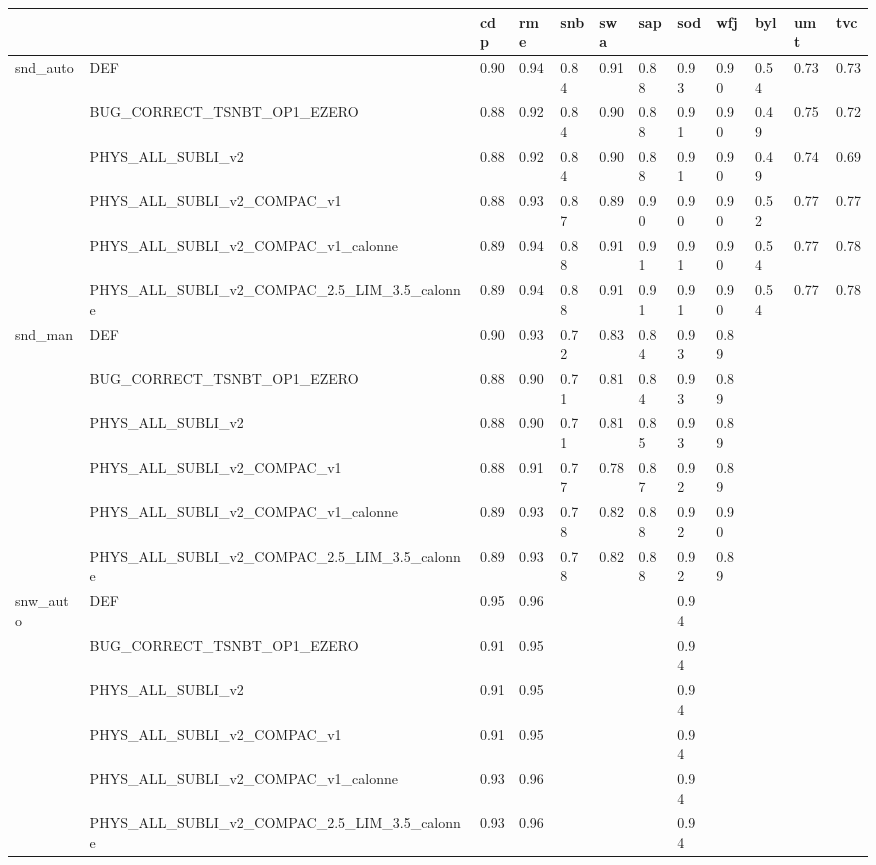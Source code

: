 \begin{tabular}{llllllllllll}
\toprule
 &  & cdp & rme & snb & swa & sap & sod & wfj & byl & umt & tvc \\
\midrule
\multirow[t]{6}{*}{snd_auto} & DEF & 0.90 & 0.94 & 0.84 & 0.91 & 0.88 & 0.93 & 0.90 & 0.54 & 0.73 & 0.73 \\
 & BUG_CORRECT_TSNBT_OP1_EZERO & 0.88 & 0.92 & 0.84 & 0.90 & 0.88 & 0.91 & 0.90 & 0.49 & 0.75 & 0.72 \\
 & PHYS_ALL_SUBLI_v2 & 0.88 & 0.92 & 0.84 & 0.90 & 0.88 & 0.91 & 0.90 & 0.49 & 0.74 & 0.69 \\
 & PHYS_ALL_SUBLI_v2_COMPAC_v1 & 0.88 & 0.93 & 0.87 & 0.89 & 0.90 & 0.90 & 0.90 & 0.52 & 0.77 & 0.77 \\
 & PHYS_ALL_SUBLI_v2_COMPAC_v1_calonne & 0.89 & 0.94 & 0.88 & 0.91 & 0.91 & 0.91 & 0.90 & 0.54 & 0.77 & 0.78 \\
 & PHYS_ALL_SUBLI_v2_COMPAC_2.5_LIM_3.5_calonne & 0.89 & 0.94 & 0.88 & 0.91 & 0.91 & 0.91 & 0.90 & 0.54 & 0.77 & 0.78 \\
\cline{1-12}
\multirow[t]{6}{*}{snd_man} & DEF & 0.90 & 0.93 & 0.72 & 0.83 & 0.84 & 0.93 & 0.89 &  &  &  \\
 & BUG_CORRECT_TSNBT_OP1_EZERO & 0.88 & 0.90 & 0.71 & 0.81 & 0.84 & 0.93 & 0.89 &  &  &  \\
 & PHYS_ALL_SUBLI_v2 & 0.88 & 0.90 & 0.71 & 0.81 & 0.85 & 0.93 & 0.89 &  &  &  \\
 & PHYS_ALL_SUBLI_v2_COMPAC_v1 & 0.88 & 0.91 & 0.77 & 0.78 & 0.87 & 0.92 & 0.89 &  &  &  \\
 & PHYS_ALL_SUBLI_v2_COMPAC_v1_calonne & 0.89 & 0.93 & 0.78 & 0.82 & 0.88 & 0.92 & 0.90 &  &  &  \\
 & PHYS_ALL_SUBLI_v2_COMPAC_2.5_LIM_3.5_calonne & 0.89 & 0.93 & 0.78 & 0.82 & 0.88 & 0.92 & 0.89 &  &  &  \\
\cline{1-12}
\multirow[t]{6}{*}{snw_auto} & DEF & 0.95 & 0.96 &  &  &  & 0.94 &  &  &  &  \\
 & BUG_CORRECT_TSNBT_OP1_EZERO & 0.91 & 0.95 &  &  &  & 0.94 &  &  &  &  \\
 & PHYS_ALL_SUBLI_v2 & 0.91 & 0.95 &  &  &  & 0.94 &  &  &  &  \\
 & PHYS_ALL_SUBLI_v2_COMPAC_v1 & 0.91 & 0.95 &  &  &  & 0.94 &  &  &  &  \\
 & PHYS_ALL_SUBLI_v2_COMPAC_v1_calonne & 0.93 & 0.96 &  &  &  & 0.94 &  &  &  &  \\
 & PHYS_ALL_SUBLI_v2_COMPAC_2.5_LIM_3.5_calonne & 0.93 & 0.96 &  &  &  & 0.94 &  &  &  &  \\

\end{tabular}
